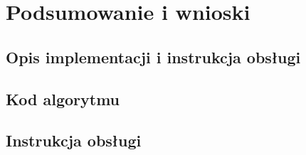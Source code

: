 \documentclass[12pt, a4paper]{article}
\begin{document}
\section{Podsumowanie i wnioski}

\begin{appendices}
\section{Opis implementacji i instrukcja obsługi}
\subsection{Kod algorytmu}
\subsection{Instrukcja obsługi}
\end{appendices}



\end{document}
